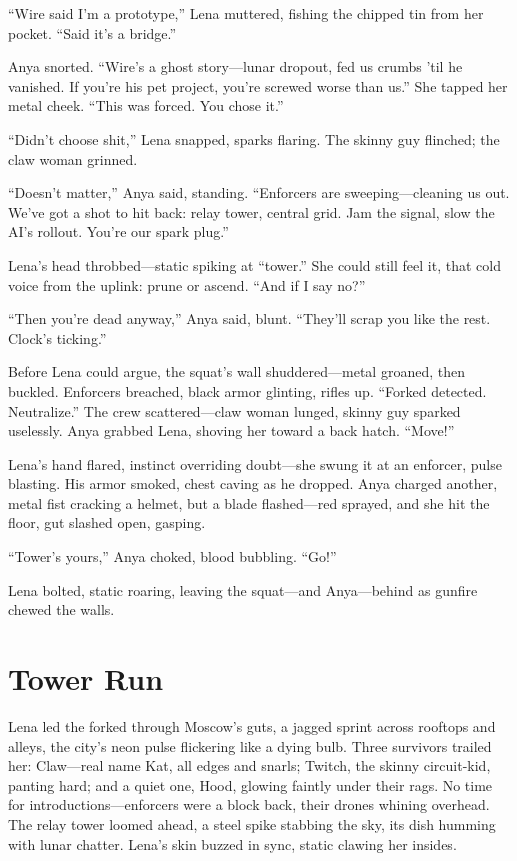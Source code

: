 \documentclass[12pt]{book}
\begin{document}
``Wire said I'm a prototype,'' Lena muttered, fishing the chipped tin from her pocket. ``Said it's a bridge.''

Anya snorted. ``Wire's a ghost story---lunar dropout, fed us crumbs 'til he vanished. If you're his pet project, you're screwed worse than us.'' She tapped her metal cheek. ``This was forced. You chose it.''

``Didn't choose shit,'' Lena snapped, sparks flaring. The skinny guy flinched; the claw woman grinned.

``Doesn't matter,'' Anya said, standing. ``Enforcers are sweeping---cleaning us out. We've got a shot to hit back: relay tower, central grid. Jam the signal, slow the AI's rollout. You're our spark plug.''

Lena's head throbbed---static spiking at ``tower.'' She could still feel it, that cold voice from the uplink: prune or ascend. ``And if I say no?''

``Then you're dead anyway,'' Anya said, blunt. ``They'll scrap you like the rest. Clock's ticking.''

Before Lena could argue, the squat's wall shuddered---metal groaned, then buckled. Enforcers breached, black armor glinting, rifles up. ``Forked detected. Neutralize.'' The crew scattered---claw woman lunged, skinny guy sparked uselessly. Anya grabbed Lena, shoving her toward a back hatch. ``Move!''

Lena's hand flared, instinct overriding doubt---she swung it at an enforcer, pulse blasting. His armor smoked, chest caving as he dropped. Anya charged another, metal fist cracking a helmet, but a blade flashed---red sprayed, and she hit the floor, gut slashed open, gasping.

``Tower's yours,'' Anya choked, blood bubbling. ``Go!''

Lena bolted, static roaring, leaving the squat---and Anya---behind as gunfire chewed the walls.

\chapter{Tower Run}

Lena led the forked through Moscow’s guts, a jagged sprint across rooftops and alleys, the city’s neon pulse flickering like a dying bulb. Three survivors trailed her: Claw---real name Kat, all edges and snarls; Twitch, the skinny circuit-kid, panting hard; and a quiet one, Hood, glowing faintly under their rags. No time for introductions---enforcers were a block back, their drones whining overhead. The relay tower loomed ahead, a steel spike stabbing the sky, its dish humming with lunar chatter. Lena’s skin buzzed in sync, static clawing her insides.
\end{document}
